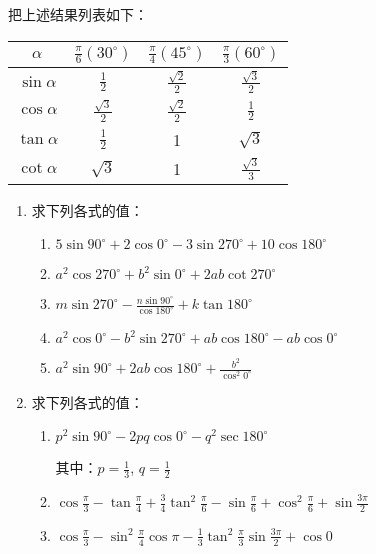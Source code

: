 把上述结果列表如下：
\begin{center}
\begin{tabular}{c|ccc}
\hline
$\alpha$  &  $\frac{\pi}{6}(30^{\circ})$   &  $\frac{\pi}{4}(45^{\circ})$   &  $\frac{\pi}{3}(60^{\circ})$   \\
\hline
$\sin\alpha$ & $\frac{1}{2}$& $\frac{\sqrt{2}}{2}$& $\frac{\sqrt{3}}{2}$\\
$\cos\alpha$ &  $\frac{\sqrt{3}}{2}$& $\frac{\sqrt{2}}{2}$& $\frac{1}{2}$\\
$\tan\alpha$ & $\frac{1}{2}$ & 1 &$\sqrt{3}$\\
$\cot\alpha$& $\sqrt{3}$ &1& $\frac{\sqrt{3}}{3}$\\
\hline
\end{tabular}
\end{center}


\begin{ex}
\begin{enumerate}
    \item  求下列各式的值：
\begin{enumerate}
    \item $5\sin90^{\circ}+2\cos0^{\circ}-3\sin270^{\circ}+10\cos180^{\circ}$
    \item $a^2\cos270^{\circ}+b^2\sin0^{\circ}+2ab\cot270^{\circ}$
    \item $m\sin270^{\circ}-\frac{n\sin90^{\circ}}{\cos180^{\circ}}+k\tan 180^{\circ}$
    \item $a^2\cos0^{\circ}-b^2\sin270^{\circ}+ab\cos180^{\circ} - ab\cos0^{\circ}$
    \item $a^2\sin90^{\circ}+2ab\cos180^{\circ}+\frac{b^2}{\cos^2 0^{\circ}}
    $
\end{enumerate}

    \item 求下列各式的值：
\begin{enumerate}
    \item $p^2\sin90^{\circ}-2pq\cos0^{\circ}-q^2\sec180^{\circ}$
    
    其中：$p=\frac{1}{3}$, $q=\frac{1}{2}$
    \item $\cos\frac{\pi}{3}-\tan\frac{\pi}{4}+\frac{3}{4}\tan^2\frac{\pi}{6}-\sin\frac{\pi}{6}+\cos^2\frac{\pi}{6}+\sin\frac{3\pi}{2}$
    \item $\cos\frac{\pi}{3}-\sin^2\frac{\pi}{4}\cos\pi-\frac{1}{3}\tan^2\frac{\pi}{3}\sin \frac{3\pi}{2}+\cos0$
\end{enumerate}
\end{enumerate}
\end{ex}

